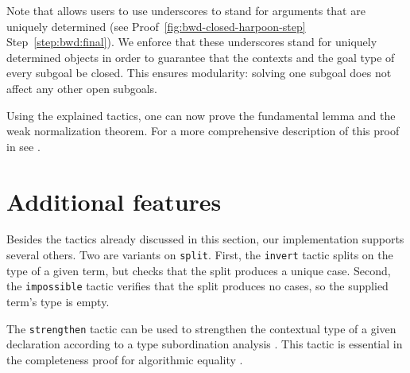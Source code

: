 Note that \Harpoon{} allows users to use underscores to stand for arguments that
are uniquely determined
(see \Harpoon{} Proof~\ref{fig:bwd-closed-harpoon-step}
Step~\ref{step:bwd:final}).
We enforce that these underscores stand for uniquely determined objects in order
to guarantee that the contexts and the goal type of every subgoal be
closed. This ensures modularity: solving one subgoal does not affect any
other open subgoals.


\begin{HarpoonProof}[h]
  
\end{HarpoonProof}

Using the explained tactics, one can now prove the fundamental lemma and the weak
normalization theorem. For a more comprehensive description of this
proof in \Beluga{} see \cite{Cave:LFMTP13,Cave:MSCS18}.

\section{Additional features}

Besides the tactics already discussed in this section, our
implementation supports several others.
%
Two are variants on \lstinline!split!. First, the \lstinline!invert! tactic
splits on the type of a given term, but checks that the split produces a unique case. Second, the
\lstinline!impossible! tactic verifies that the split produces no cases, so the
supplied term's type is empty.

The \lstinline!strengthen! tactic can be used to strengthen the contextual type
of a given declaration according to a type subordination analysis \cite{virga1999}.
This tactic is essential in the completeness proof for algorithmic equality
\cite{Cave:MSCS18}.

